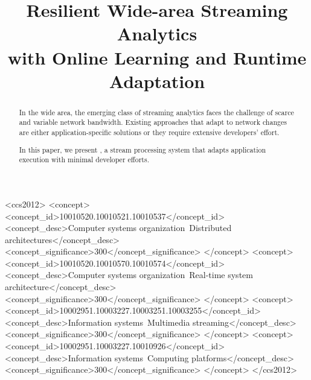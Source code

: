 \documentclass[sigplan, anonymous, review]{acmart}
\begin{document}
\title{Resilient Wide-area Streaming Analytics \\
  with Online Learning and Runtime Adaptation}

\renewcommand{\shortauthors}{B. Zhang et al.}



\begin{abstract}
  In the wide area, the emerging class of streaming analytics faces the
  challenge of scarce and variable network bandwidth. Existing approaches that
  adapt to network changes are either application-specific solutions or they
  require extensive developers' effort.

  In this paper, we present \sysname{}, a stream processing system that adapts
  application execution with minimal developer efforts.
\end{abstract}

%
\begin{CCSXML}
<ccs2012>
  <concept>
    <concept_id>10010520.10010521.10010537</concept_id>
    <concept_desc>Computer systems organization~Distributed architectures</concept_desc>
    <concept_significance>300</concept_significance>
  </concept>
  <concept>
    <concept_id>10010520.10010570.10010574</concept_id>
    <concept_desc>Computer systems organization~Real-time system architecture</concept_desc>
    <concept_significance>300</concept_significance>
  </concept>
  <concept>
    <concept_id>10002951.10003227.10003251.10003255</concept_id>
    <concept_desc>Information systems~Multimedia streaming</concept_desc>
    <concept_significance>300</concept_significance>
  </concept>
  <concept>
    <concept_id>10002951.10003227.10010926</concept_id>
    <concept_desc>Information systems~Computing platforms</concept_desc>
    <concept_significance>300</concept_significance>
  </concept>
</ccs2012>
\end{CCSXML}




\maketitle

% 
% 
% 
% 
% 
% 
% 
% 

\newpage

\newpage




\end{document}
